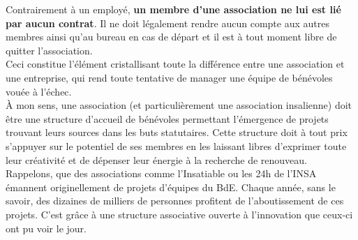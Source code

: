 Contrairement à un employé, \textbf{un membre d'une association ne lui est lié par aucun contrat}. Il ne doit légalement rendre aucun compte aux autres membres ainsi qu'au bureau en cas de départ et il est à tout moment libre de quitter l'association. \\
Ceci constitue l'élément cristallisant toute la différence entre une association et une entreprise, qui rend toute tentative de manager une équipe de bénévoles vouée à l'échec.\\

À mon sens, une association (et particulièrement une association insalienne) doit \^{e}tre une structure d'accueil de bénévoles permettant l'émergence de projets trouvant leurs sources dans les buts statutaires. Cette structure doit à tout prix s'appuyer sur le potentiel de ses membres en les laissant libres d'exprimer toute leur créativité et de dépenser leur énergie à la recherche de renouveau.\\

Rappelons, que des associations comme l'Insatiable ou les 24h de l'INSA émannent originellement de projets d'équipes du BdE. Chaque année, sans le savoir, des dizaines de milliers de personnes profitent de l'aboutissement de ces projets. C'est grâce à une structure associative ouverte à l'innovation que ceux-ci ont pu voir le jour.







